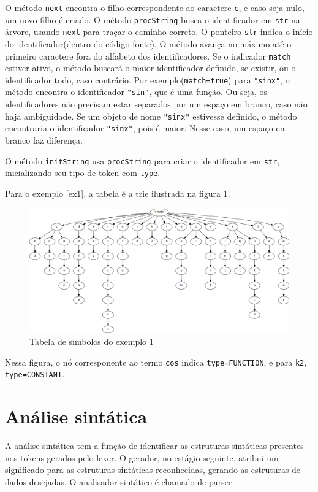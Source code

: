 O método \texttt{next} encontra o filho correspondente ao caractere \texttt{c},
e caso seja nulo, um novo filho é criado.
O método \texttt{procString} busca o identificador em \texttt{str} na árvore,
usando \texttt{next} para traçar o caminho correto.
O ponteiro \texttt{str} indica o início do identificador(dentro do código-fonte).
O método avança no máximo até o primeiro caractere fora do alfabeto
dos identificadores.
Se o indicador \texttt{match} estiver ativo, o método buscará o
maior identificador definido, se existir, ou o identificador todo, caso contrário.
Por exemplo(\texttt{match=true}) para \texttt{"sinx"},
o método encontra o identificador \texttt{"sin"}, que é uma função.
Ou seja, os identificadores não precisam estar separados por um espaço em branco,
caso não haja ambiguidade.
Se um objeto de nome \texttt{"sinx"} estivesse definido,
o método encontraria o identificador \texttt{"sinx"}, pois é maior.
Nesse caso, um espaço em branco faz diferença.

O método \texttt{initString} usa \texttt{procString}
para criar o identificador em \texttt{str},
inicializando seu tipo de token com \texttt{type}.

Para o exemplo \ref{ex1}, a tabela é a trie ilustrada na figura \ref{img:ex1table}.
\begin{figure}[!ht]
    \includegraphics[width=\linewidth]{ex1table.png}
    \caption{Tabela de símbolos do exemplo 1}
    \label{img:ex1table}
\end{figure}

Nessa figura, o nó corresponente ao termo \texttt{cos} indica \texttt{type=FUNCTION},
e para \texttt{k2}, \texttt{type=CONSTANT}.

\section{Análise sintática}
A análise sintática tem a função de identificar as estruturas sintáticas
presentes nos tokens gerados pelo lexer.
O gerador, no estágio seguinte, atribui um significado para as estruturas
sintáticas reconhecidas, gerando as estruturas de dados desejadas.
O analisador sintático é chamado de parser.

